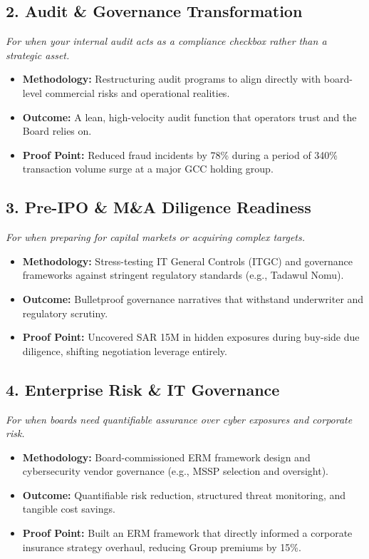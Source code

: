 \documentclass[11pt,a4paper]{article}
\begin{document}
\vspace{0.1cm}
\subsection*{2. Audit \& Governance Transformation}
\textit{For when your internal audit acts as a compliance checkbox rather than a strategic asset.}
\begin{itemize}
    \item \textbf{Methodology:} Restructuring audit programs to align directly with board-level commercial risks and operational realities.
    \item \textbf{Outcome:} A lean, high-velocity audit function that operators trust and the Board relies on.
    \item \textbf{Proof Point:} Reduced fraud incidents by 78\% during a period of 340\% transaction volume surge at a major GCC holding group.
\end{itemize}

\vspace{0.1cm}
\subsection*{3. Pre-IPO \& M\&A Diligence Readiness}
\textit{For when preparing for capital markets or acquiring complex targets.}
\begin{itemize}
    \item \textbf{Methodology:} Stress-testing IT General Controls (ITGC) and governance frameworks against stringent regulatory standards (e.g., Tadawul Nomu).
    \item \textbf{Outcome:} Bulletproof governance narratives that withstand underwriter and regulatory scrutiny.
    \item \textbf{Proof Point:} Uncovered SAR 15M in hidden exposures during buy-side due diligence, shifting negotiation leverage entirely.
\end{itemize}

\vspace{0.1cm}
\subsection*{4. Enterprise Risk \& IT Governance}
\textit{For when boards need quantifiable assurance over cyber exposures and corporate risk.}
\begin{itemize}
    \item \textbf{Methodology:} Board-commissioned ERM framework design and cybersecurity vendor governance (e.g., MSSP selection and oversight).
    \item \textbf{Outcome:} Quantifiable risk reduction, structured threat monitoring, and tangible cost savings.
    \item \textbf{Proof Point:} Built an ERM framework that directly informed a corporate insurance strategy overhaul, reducing Group premiums by 15\%.
\end{itemize}
\end{document}
